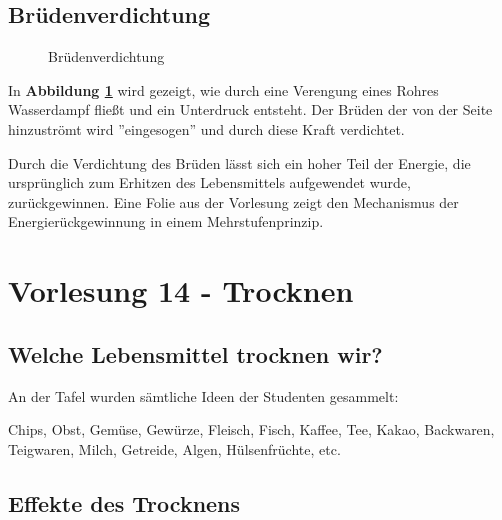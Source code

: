 \documentclass[a4paper,10pt]{article}
\begin{document}
\subsection{Brüdenverdichtung}
\begin{figure}[h]
\centering

\caption{Brüdenverdichtung}
\label{fig1}
\end{figure}

In \textbf{Abbildung \ref{fig1}} wird gezeigt, wie durch eine Verengung eines Rohres Wasserdampf fließt und ein Unterdruck entsteht. Der Brüden der von der Seite hinzuströmt wird ''eingesogen'' und durch diese Kraft verdichtet.\par
Durch die Verdichtung des Brüden lässt sich ein hoher Teil der Energie, die ursprünglich zum Erhitzen des Lebensmittels aufgewendet wurde, zurückgewinnen. Eine Folie aus der Vorlesung zeigt den Mechanismus der Energierückgewinnung in einem Mehrstufenprinzip.

\pagebreak
\section{Vorlesung 14 - Trocknen}
\subsection{Welche Lebensmittel trocknen wir?}
An der Tafel wurden sämtliche Ideen der Studenten gesammelt: \par 
Chips, Obst, Gemüse, Gewürze, Fleisch, Fisch, Kaffee, Tee, Kakao, Backwaren, Teigwaren, Milch, Getreide, Algen, Hülsenfrüchte, etc.
\pp
{}

\subsection{Effekte des Trocknens}
\end{document}
